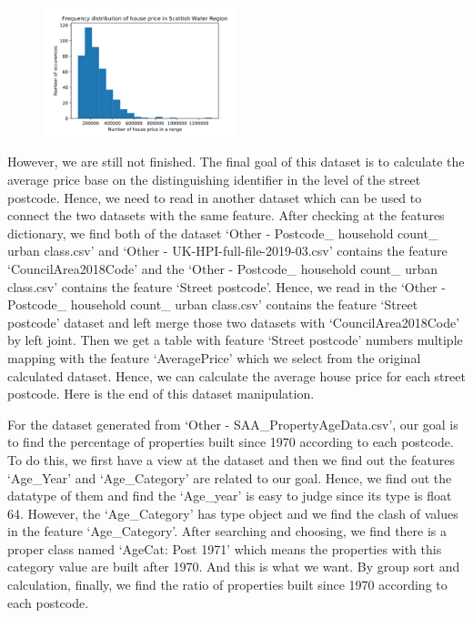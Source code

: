 \documentclass[11pt,twoside]{article}
\numberwithin{Theorem}{section}
\numberwithin{Definition}{section}
\numberwithin{Lemma}{section}
\numberwithin{Algorithm}{section}
\numberwithin{equation}{section}
\begin{document}
\begin{figure}[!ht]
    \centering
    \includegraphics[width=0.5\textwidth]{p8.png}
    \end{figure}

However, we are still not finished. The final goal of this dataset is to calculate the average price base on the distinguishing identifier in the level of the street postcode. Hence, we need to read in another dataset which can be used to connect the two datasets with the same feature. After checking at the features dictionary, we find both of the dataset ‘Other - Postcode\_ household count\_ urban class.csv’ and ‘Other - UK-HPI-full-file-2019-03.csv’ contains the feature ‘CouncilArea2018Code’ and the ‘Other - Postcode\_ household count\_ urban class.csv’ contains the feature ‘Street postcode’. Hence, we read in the ‘Other - Postcode\_ household count\_ urban class.csv’ contains the feature ‘Street postcode’ dataset and left merge those two datasets with ‘CouncilArea2018Code’ by left joint. Then we get a table with feature ‘Street postcode’ numbers multiple mapping with the feature ‘AveragePrice’ which we select from the original calculated dataset. Hence, we can calculate the average house price for each street postcode. Here is the end of this dataset manipulation.

For the dataset generated from ‘Other - SAA\_PropertyAgeData.csv’, our goal is to find the percentage of properties built since 1970 according to each postcode. To do this, we first have a view at the dataset and then we find out the features ‘Age\_Year’ and ‘Age\_Category’ are related to our goal. Hence, we find out the datatype of them and find the ‘Age\_year’ is easy to judge since its type is float 64. However, the ‘Age\_Category’ has type object and we find the clash of values in the feature ‘Age\_Category’. After searching and choosing, we find there is a proper class named ‘AgeCat: Post 1971’ which means the properties with this category value are built after 1970. And this is what we want. By group sort and calculation, finally, we find the ratio of properties built since 1970 according to each postcode.
\end{document}
